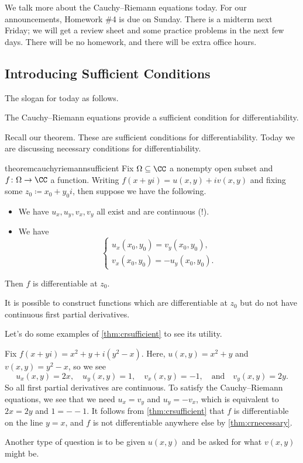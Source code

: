 \documentclass[../notes.tex]{subfiles}
\begin{document}

We talk more about the Cauchy--Riemann equations today. For our announcements, Homework \#4 is due on Sunday. There is a midterm next Friday; we will get a review sheet and some practice problems in the next few days. There will be no homework, and there will be extra office hours.

\subsection{Introducing Sufficient Conditions}

The slogan for today as follows.
\begin{idea}
	The Cauchy--Riemann equations provide a sufficient condition for differentiability.
\end{idea}
Recall our theorem.
\cauchyriemannnecessary*
\noindent These are sufficient conditions for differentiability. Today we are discussing necessary conditions for differentiability.
\begin{restatable}{theorem}{cauchyriemannsufficient} \label{thm:crsufficient}
	Fix $\Omega\subseteq\CC$ a nonempty open subset and $f\colon \Omega\to\CC$ a function. Writing $f(x+yi)=u(x,y)+iv(x,y)$ and fixing some $z_0\coloneqq x_0+y_0i$, then suppose we have the following.
	\begin{itemize}
		\item We have $u_x,u_y,v_x,v_y$ all exist and are continuous (!).
		\item We have
		\[\begin{cases}
			u_x(x_0,y_0)=v_y(x_0,y_0), \\
			v_x(x_0,y_0)=-u_y(x_0,y_0).
		\end{cases}\]
	\end{itemize}
	Then $f$ is differentiable at $z_0$.
\end{restatable}
\begin{remark}
	It is possible to construct functions which are differentiable at $z_0$ but do not have continuous first partial derivatives.
\end{remark}
Let's do some examples of \autoref{thm:crsufficient} to see its utility.
\begin{example}
	Fix $f(x+yi)=x^2+y+i\left(y^2-x\right)$. Here, $u(x,y)=x^2+y$ and $v(x,y)=y^2-x$, so we see
	\[u_x(x,y)=2x,\quad u_y(x,y)=1,\quad v_x(x,y)=-1,\quad\text{and}\quad v_y(x,y)=2y.\]
	So all first partial derivatives are continuous. To satisfy the Cauchy--Riemann equations, we see that we need $u_x=v_y$ and $u_y=-v_x$, which is equivalent to $2x=2y$ and $1=--1$. It follows from \autoref{thm:crsufficient} that $f$ is differentiable on the line $y=x$, and $f$ is not differentiable anywhere else by \autoref{thm:crnecessary}.
\end{example}
\begin{remark}
	Another type of question is to be given $u(x,y)$ and be asked for what $v(x,y)$ might be.
\end{remark}
\end{document}
